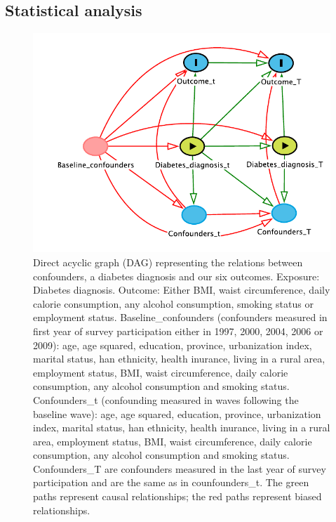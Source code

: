 \subsection*{Statistical analysis}
\begin{figure}
\begin{center}
\includegraphics[scale=0.5]{Chapter5/Figures/dag_II_alt}
 \end{center}
\footnotesize{\caption{\label{fig:DAG} Direct acyclic graph (DAG) representing the relations between confounders, a diabetes diagnosis and our six outcomes. Exposure: Diabetes diagnosis.
Outcome: Either BMI, waist circumference, daily calorie consumption, any alcohol consumption, smoking status or employment status. Baseline\_confounders (confounders measured in first year of survey participation either in 1997, 2000, 2004, 2006 or 2009): age, age squared, education, province, urbanization index, marital status, han ethnicity, health inurance, living in a rural area, employment status, BMI, waist circumference, daily calorie consumption, any alcohol consumption and smoking status.
Confounders\_t (confounding measured in waves following the baseline wave): age, age squared, education, province, urbanization index, marital status, han ethnicity, health inurance, living in a rural area, employment status, BMI, waist circumference, daily calorie consumption, any alcohol consumption and smoking status. Confounders\_T are confounders measured in the last year of survey participation and are the same as in counfounders\_t. The green paths represent causal relationships; the red paths represent biased relationships.}}
\end{figure}

